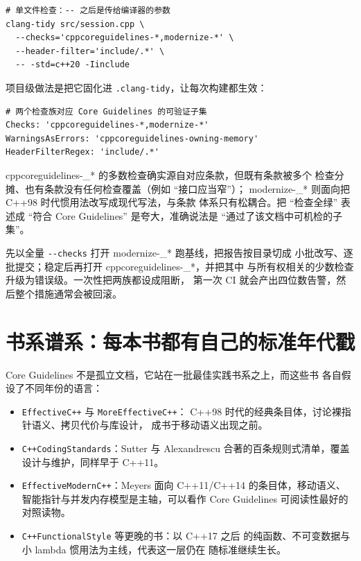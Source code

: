 \documentclass[12pt,a4paper,fontset=fandol]{ctexbook}
\newcommand{\cpp}[1]{C++#1}
\newcommand{\Tp}[1]{\texttt{#1}}
\newcommand{\Opt}[1]{\texttt{-\/-#1}}
\newcommand{\Bk}{\discretionary{}{}{}}
\begin{document}
\begin{lstlisting}[style=shellstyle,caption={用 \Tp{clang-tidy} 同时启用两个语义检查族},label={lst:ch05-tidy-cli}]
# 单文件检查：-- 之后是传给编译器的参数
clang-tidy src/session.cpp \
  --checks='cppcoreguidelines-*,modernize-*' \
  --header-filter='include/.*' \
  -- -std=c++20 -Iinclude
\end{lstlisting}

项目级做法是把它固化进 \Tp{.clang-tidy}，让每次构建都生效：

\begin{lstlisting}[style=yamlstyle,caption={.clang-tidy 的最小语义层配置},label={lst:ch05-tidy-yaml}]
# 两个检查族对应 Core Guidelines 的可验证子集
Checks: 'cppcoreguidelines-*,modernize-*'
WarningsAsErrors: 'cppcoreguidelines-owning-memory'
HeaderFilterRegex: 'include/.*'
\end{lstlisting}

\begin{note}[title={检查族与条款编号不是一一对应}]
cppcore\allowbreak guidelines-\allowbreak \_* 的多数检查确实源自对应条款，但既有条款被多个
检查分摊、也有条款没有任何检查覆盖（例如 ``接口应当窄''）；
modernize-\_* 则面向把 \cpp{98} 时代惯用法改写成现代写法，与条款
体系只有松耦合。把 ``检查全绿'' 表述成 ``符合 Core Guidelines''
是夸大，准确说法是 ``通过了该文档中可机检的子集''。
\end{note}

\begin{bestpractice}[title={两个检查族的引入节奏}]
先以全量 \Opt{checks} 打开 modernize-\_* 跑基线，把报告按目录切成
小批改写、逐批提交；稳定后再打开 cppcore\allowbreak guidelines-\allowbreak \_*，并把其中
与所有权相关的少数检查升级为错误级。一次性把两族都设成阻断，
第一次 CI 就会产出四位数告警，然后整个措施通常会被回滚。
\end{bestpractice}

\section{书系谱系：每本书都有自己的标准年代戳}
\label{sec:ch05-books}

Core Guidelines 不是孤立文档，它站在一批最佳实践书系之上，而这些书
各自假设了不同年份的语言：

\begin{itemize}
\item \Tp{Effective{\Bk}C++} 与 \Tp{More{\Bk}Effective{\Bk}C++}：
  \cpp{98} 时代的经典条目体，讨论裸指针语义、拷贝代价与库设计，
  成书于移动语义出现之前。
\item \Tp{C++{\Bk}Coding{\Bk}Standards}：Sutter 与 Alexandrescu
  合著的百条规则式清单，覆盖设计与维护，同样早于 \cpp{11}。
\item \Tp{Effective{\Bk}Modern{\Bk}C++}：Meyers 面向 \cpp{11}/{\Bk}\cpp{14}
  的条目体，移动语义、智能指针与并发内存模型是主轴，可以看作
  Core Guidelines 可阅读性最好的对照读物。
\item \Tp{C++{\Bk}Functional{\Bk}Style} 等更晚的书：以 \cpp{17} 之后
  的纯函数、不可变数据与小 lambda 惯用法为主线，代表这一层仍在
  随标准继续生长。
\end{itemize}
\end{document}
